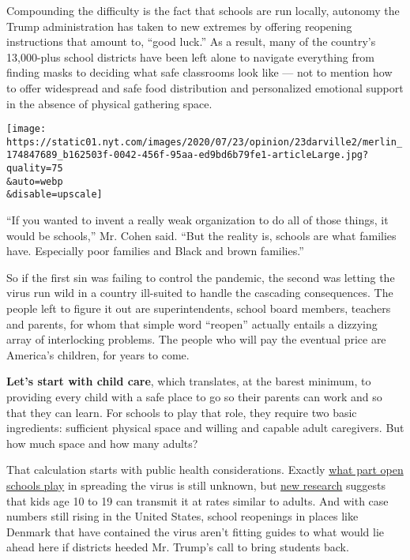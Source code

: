 Compounding the difficulty is the fact that schools are run locally,
autonomy the Trump administration has taken to new extremes by offering
reopening instructions that amount to, ``good luck.'' As a result, many
of the country's 13,000-plus school districts have been left alone to
navigate everything from finding masks to deciding what safe classrooms
look like --- not to mention how to offer widespread and safe food
distribution and personalized emotional support in the absence of
physical gathering space.

\texttt{[image: https://static01.nyt.com/images/2020/07/23/opinion/23darville2/merlin\_174847689\_b162503f-0042-456f-95aa-ed9bd6b79fe1-articleLarge.jpg?quality=75\\\&auto=webp\\\&disable=upscale]}

``If you wanted to invent a really weak organization to do all of those
things, it would be schools,'' Mr. Cohen said. ``But the reality is,
schools are what families have. Especially poor families and Black and
brown families.''

So if the first sin was failing to control the pandemic, the second was
letting the virus run wild in a country ill-suited to handle the
cascading consequences. The people left to figure it out are
superintendents, school board members, teachers and parents, for whom
that simple word ``reopen'' actually entails a dizzying array of
interlocking problems. The people who will pay the eventual price are
America's children, for years to come.

\textbf{Let's start with child care}, which translates, at the barest
minimum, to providing every child with a safe place to go so their
parents can work and so that they can learn. For schools to play that
role, they require two basic ingredients: sufficient physical space and
willing and capable adult caregivers. But how much space and how many
adults?

That calculation starts with public health considerations. Exactly
\href{https://www.nytimes.com/2020/07/11/health/coronavirus-schools-reopen.html}{what
part open schools play} in spreading the virus is still unknown, but
\href{https://www.nytimes.com/2020/07/18/health/coronavirus-children-schools.html?action=click\&module=Top\%20Stories\&pgtype=Homepage}{new
research} suggests that kids age 10 to 19 can transmit it at rates
similar to adults. And with case numbers still rising in the United
States, school reopenings in places like Denmark that have contained the
virus aren't fitting guides to what would lie ahead here if districts
heeded Mr. Trump's call to bring students back.


